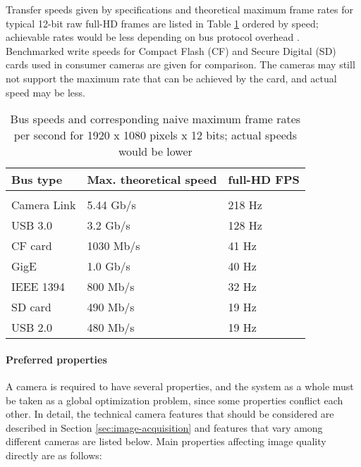 Transfer speeds given by specifications and theoretical maximum frame rates for typical 12-bit raw full-HD frames are listed in Table \ref{tab:busspeeds} ordered by speed; achievable rates would be less depending on bus protocol overhead \cite{hornberg2007handbook,ni2013choosing}.
Benchmarked \cite{tomshw-sdwrite,tomshw-cfwrite} write speeds for Compact Flash (CF) and Secure Digital (SD) cards used in consumer cameras are given for comparison.
The cameras may still not support the maximum rate that can be achieved by the card, and actual speed may be less.

\begin{table}[h]
	\centering
	\begin{tabular}{l l l}
		Bus type & Max. theoretical speed & full-HD FPS\\
		\hline \\
		Camera Link \cite{ni2013choosing} & 5.44 Gb/s & 218 Hz\\
		USB 3.0 \cite{ni2013choosing} & 3.2 Gb/s & 128 Hz\\
		CF card \cite{tomshw-cfwrite} & 1030 Mb/s & 41 Hz\\
		GigE \cite{ni2013choosing} & 1.0 Gb/s & 40 Hz\\
		IEEE 1394 \cite{ni2013choosing} & 800 Mb/s & 32 Hz\\
		SD card \cite{tomshw-sdwrite} & 490 Mb/s & 19 Hz\\
		USB 2.0 \cite{ni2013choosing} & 480 Mb/s & 19 Hz\\
	\end{tabular}
	\caption{Bus speeds and corresponding naive maximum frame rates per second for 1920 x 1080 pixels x 12 bits; actual speeds would be lower}
	\label{tab:busspeeds}
\end{table}

\paragraph{Preferred properties}
A camera is required to have several properties, and the system as a whole must be taken as a global optimization problem, since some properties conflict each other.
In detail, the technical camera features that should be considered are described in Section \ref{sec:image-acquisition} and features that vary among different cameras are listed below.
Main properties affecting image quality directly are as follows:

